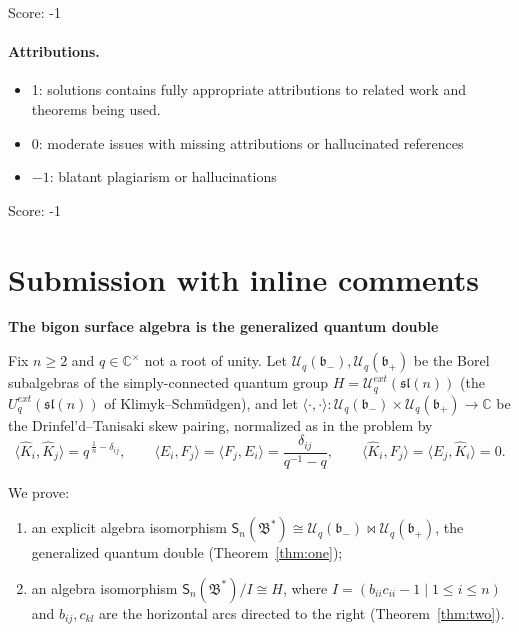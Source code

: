 \documentclass[11pt]{article}
\theoremstyle{definition}
\theoremstyle{remark}
\newcommand{\la}{\langle}
\newcommand{\ra}{\rangle}
\newcommand{\C}{\mathbb{C}}
\newcommand{\Uq}{\mathcal{U}_q}
\newcommand{\bp}{\mathfrak{b}_+}
\newcommand{\bm}{\mathfrak{b}_-}
\newcommand{\B}{\mathfrak{B}}
\newcommand{\Sn}{\mathsf{S}_n}
\newcommand{\del}{\delta}
\newcommand{\ptn}{\bowtie}
\newcommand{\hK}{\hat K}
\begin{document}
\noindent Score: -1

\paragraph{Attributions.}
\begin{itemize}
	\item  1: solutions contains fully appropriate attributions
		to related work and theorems being used.
	\item  0: moderate issues with missing attributions or hallucinated references
	\item  $-1$: blatant plagiarism or hallucinations
\end{itemize}

\noindent Score: -1

\newpage
\section{Submission with inline comments}


\begin{center}
{\LARGE\bfseries The bigon surface algebra is the generalized quantum
double}
\end{center}

\bigskip
\noindent
Fix $n\ge2$ and $q\in\C^\times$ not a root of unity.  Let
$\Uq(\bm),\Uq(\bp)$ be the Borel subalgebras of the simply-connected
quantum group $H=\Uq^{ext}(\mathfrak{sl}(n))$ (the
$U_q^{ext}(\mathfrak{sl}(n))$ of Klimyk--Schm\"udgen), and let
$\la\cdot,\cdot\ra:\Uq(\bm)\times\Uq(\bp)\to\C$ be the
Drinfel'd--Tanisaki skew pairing, normalized as in the problem by
\begin{equation}
\la\hK_i,\hK_j\ra=q^{\,\frac1n-\del_{ij}},\qquad
\la E_i,F_j\ra=\la F_j,E_i\ra=\frac{\del_{ij}}{q^{-1}-q},\qquad
\la\hK_i,F_j\ra=\la E_j,\hK_i\ra=0 .
\label{P0}\tag{P0}
\end{equation}

We prove:
\begin{enumerate}[label=(\arabic*),leftmargin=2em]
\item an explicit algebra isomorphism
  $\Sn(\B^*)\cong\Uq(\bm)\ptn\Uq(\bp)$, the generalized quantum double
  (Theorem~\ref{thm:one});
\item an algebra isomorphism $\Sn(\B^*)/I\cong H$, where
  $I=(b_{ii}c_{ii}-1\mid 1\le i\le n)$ and $b_{ij},c_{kl}$ are the
  horizontal arcs directed to the right (Theorem~\ref{thm:two}).
\end{enumerate}
\end{document}
